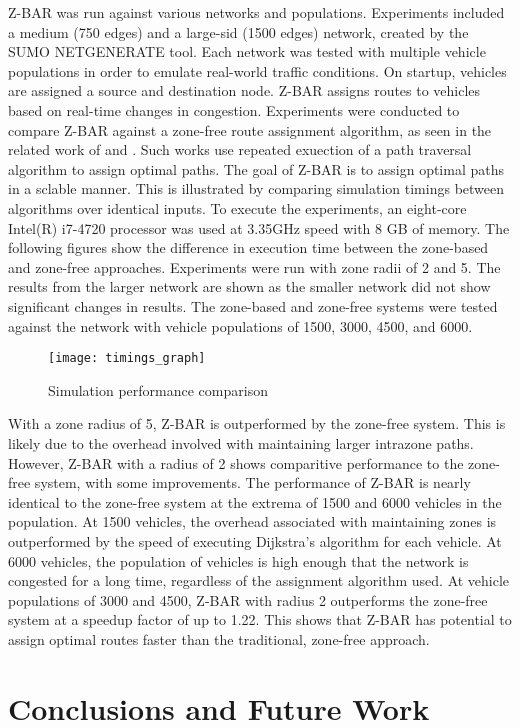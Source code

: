 \documentclass[12pt,conference]{IEEEtran}
\begin{document}
Z-BAR was run against various networks and populations. Experiments included a medium (750 edges) and a large-sid (1500 edges) network, created by the SUMO NETGENERATE tool. Each network was tested with multiple vehicle populations in order to emulate real-world traffic conditions. On startup, vehicles are assigned a source and destination node. Z-BAR assigns routes to vehicles based on real-time changes in congestion. Experiments were conducted to compare Z-BAR against a zone-free route assignment algorithm, as seen in the related work of \cite{iaco} and \cite{dtpos}. Such works use repeated exuection of a path traversal algorithm to assign optimal paths. The goal of Z-BAR is to assign optimal paths in a sclable manner. This is illustrated by comparing simulation timings between algorithms over identical inputs. To execute the experiments, an eight-core Intel(R) i7-4720 processor was used at 3.35GHz speed with 8 GB of memory. The following figures show the difference in execution time between the zone-based and zone-free approaches. Experiments were run with zone radii of 2 and 5. The results from the larger network are shown as the smaller network did not show significant changes in results. The zone-based and zone-free systems were tested against the network with vehicle populations of 1500, 3000, 4500, and 6000.\begin{figure}[h]
\caption{Simulation performance comparison}
\centering
\texttt{[image: timings\_graph]}
\end{figure}With a zone radius of 5, Z-BAR is outperformed by the zone-free system. This is likely due to the overhead involved with maintaining larger intrazone paths. However, Z-BAR with a radius of 2 shows comparitive performance to the zone-free system, with some improvements. The performance of Z-BAR is nearly identical to the zone-free system at the extrema of 1500 and 6000 vehicles in the population. At 1500 vehicles, the overhead associated with maintaining zones is outperformed by the speed of executing Dijkstra's algorithm for each vehicle. At 6000 vehicles, the population of vehicles is high enough that the network is congested for a long time, regardless of the assignment algorithm used. At vehicle populations of 3000 and 4500, Z-BAR with radius 2 outperforms the zone-free system at a speedup factor of up to 1.22. This shows that Z-BAR has potential to assign optimal routes faster than the traditional, zone-free approach.

\section{Conclusions and Future Work} 
\end{document}
